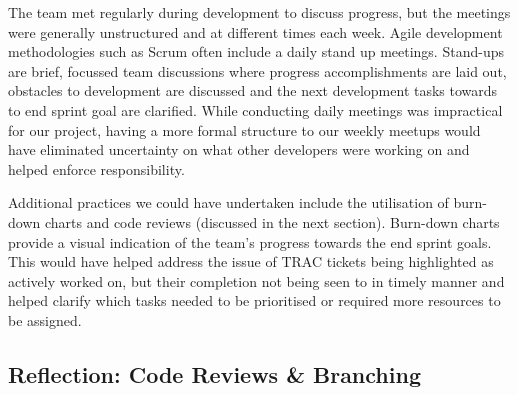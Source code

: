 \documentclass{l3proj}
\begin{document}
The team met regularly during development to discuss progress, but the meetings were generally unstructured and at different times each week. Agile development methodologies such as Scrum often include a daily stand up meetings. Stand-ups are brief, focussed team discussions where progress accomplishments are laid out, obstacles to development are discussed and the next development tasks towards to end sprint goal are clarified. While conducting daily meetings was impractical for our project, having a more formal structure to our weekly meetups would have eliminated uncertainty on what other developers were working on and helped enforce responsibility. 

Additional practices we could have undertaken include the utilisation of burn-down charts and code reviews (discussed in the next section). Burn-down charts provide a visual indication of the team’s progress towards the end sprint goals. This would have helped address the issue of TRAC tickets being highlighted as actively worked on, but their completion not being seen to in timely manner and helped clarify which tasks needed to be prioritised or required more resources to be assigned. 


\subsection{Reflection: Code Reviews \& Branching}
\label{sec:codereviewbranch}




\end{document}
